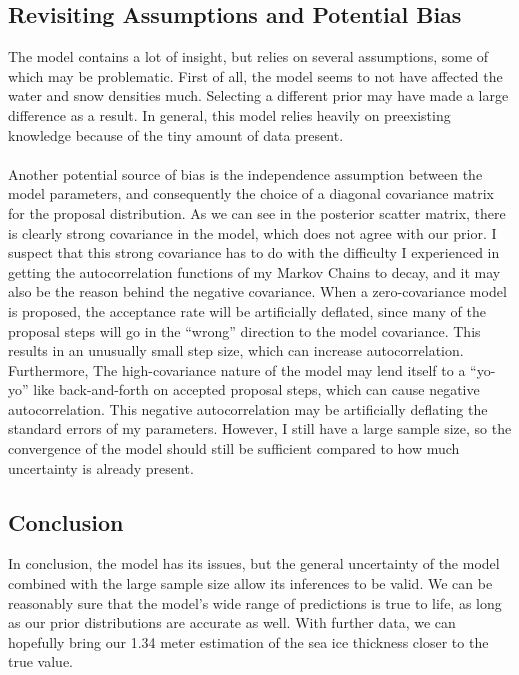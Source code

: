 \documentclass[12pt, letterpaper]{article}
\begin{document}
\subsection{Revisiting Assumptions and Potential Bias}
The model contains a lot of insight, but relies on several assumptions, some of which may be problematic. First of all,
the model seems to not have affected the water and snow densities much. Selecting a different prior may have made a large difference
as a result. In general, this model relies heavily on preexisting knowledge because of the tiny amount of data present.
\\\\
Another potential source of bias is the independence assumption between the model parameters, and consequently the choice
of a diagonal covariance matrix for the proposal distribution. As we can see in the posterior scatter matrix, there is clearly
strong covariance in the model, which does not agree with our prior. I suspect that this strong covariance has to do with the difficulty I
experienced in getting the autocorrelation functions of my Markov Chains to decay, and it may also be the reason behind the negative covariance.
When a zero-covariance model is proposed, the acceptance rate will be artificially deflated, since many of the proposal steps will go in the
``wrong'' direction to the model covariance. This results in an unusually small step size, which can increase autocorrelation. Furthermore,
The high-covariance nature of the model may lend itself to a ``yo-yo'' like back-and-forth on accepted proposal steps, which can cause negative
autocorrelation. This negative autocorrelation may be artificially deflating the standard errors of my parameters. However, I still have a large sample size,
so the convergence of the model should still be sufficient compared to how much uncertainty is already present.

\subsection{Conclusion}
In conclusion, the model has its issues, but the general uncertainty of the model combined with the large sample size allow its inferences to be valid.
We can be reasonably sure that the model's wide range of predictions is true to life, as long as our prior distributions are accurate as well.
With further data, we can hopefully bring our 1.34 meter estimation of the sea ice thickness closer to the true value.
\end{document}
